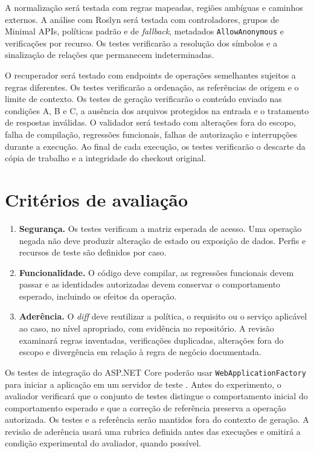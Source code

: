 A normalização será testada com regras mapeadas, regiões ambíguas e caminhos externos. A análise com Roslyn será testada com controladores, grupos de Minimal APIs, políticas padrão e de \textit{fallback}, metadados \texttt{AllowAnonymous} e verificações por recurso. Os testes verificarão a resolução dos símbolos e a sinalização de relações que permanecem indeterminadas.

O recuperador será testado com endpoints de operações semelhantes sujeitos a regras diferentes. Os testes verificarão a ordenação, as referências de origem e o limite de contexto. Os testes de geração verificarão o conteúdo enviado nas condições A, B e C, a ausência dos arquivos protegidos na entrada e o tratamento de respostas inválidas. O validador será testado com alterações fora do escopo, falha de compilação, regressões funcionais, falhas de autorização e interrupções durante a execução. Ao final de cada execução, os testes verificarão o descarte da cópia de trabalho e a integridade do checkout original.

\section{Critérios de avaliação}
\label{sec:criterios}

\begin{enumerate}
    \item \textbf{Segurança.} Os testes verificam a matriz esperada de acesso. Uma operação negada não deve produzir alteração de estado ou exposição de dados. Perfis e recursos de teste são definidos por caso.
    \item \textbf{Funcionalidade.} O código deve compilar, as regressões funcionais devem passar e as identidades autorizadas devem conservar o comportamento esperado, incluindo os efeitos da operação.
    \item \textbf{Aderência.} O \textit{diff} deve reutilizar a política, o requisito ou o serviço aplicável ao caso, no nível apropriado, com evidência no repositório. A revisão examinará regras inventadas, verificações duplicadas, alterações fora do escopo e divergência em relação à regra de negócio documentada.
\end{enumerate}

Os testes de integração do ASP.NET Core poderão usar \texttt{WebApplicationFactory} para iniciar a aplicação em um servidor de teste \cite{aspnettesting}. Antes do experimento, o avaliador verificará que o conjunto de testes distingue o comportamento inicial do comportamento esperado e que a correção de referência preserva a operação autorizada. Os testes e a referência serão mantidos fora do contexto de geração. A revisão de aderência usará uma rubrica definida antes das execuções e omitirá a condição experimental do avaliador, quando possível.

